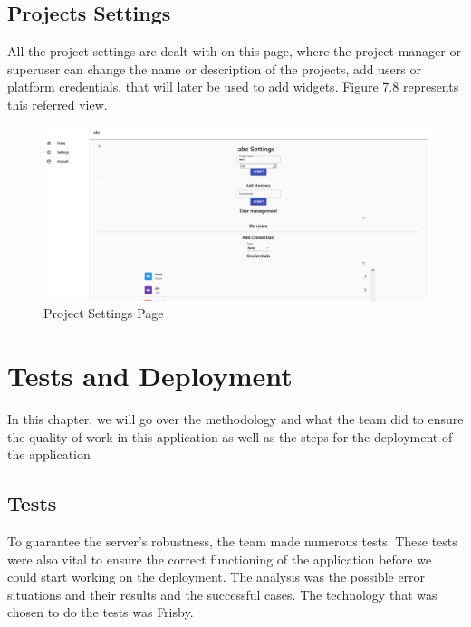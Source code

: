 \documentclass[a4paper,twoside,10pt]{report}
\begin{document}
\section{Projects Settings}
All the project settings are dealt with on this page, where the project manager or superuser can change the name or description of the projects, add users or platform credentials, that will later be used to add widgets. Figure 7.8 represents this referred view.

\begin{figure}[h!]
\center
  \includegraphics[width=\textwidth]{projectsettingsPage.png}
\caption{Project Settings Page}
\end{figure}

\chapter{Tests and Deployment}
In this chapter, we will go over the methodology and what the team did to ensure the quality of work in this application as well as the steps for the deployment of the application

\section{Tests}
To guarantee the server's robustness, the team made numerous tests. These tests were also vital to ensure the correct functioning of the application before we could start working on the deployment.  The analysis was the possible error situations and their results and the successful cases. The technology that was chosen to do the tests was Frisby.
\end{document}
